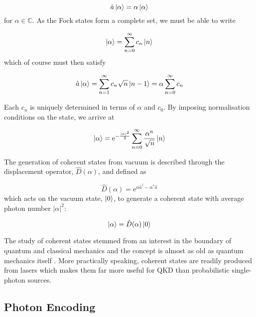 \begin{equation}
	\hat{a}\ket{\alpha} = \alpha\ket{\alpha}
\end{equation}
for $\alpha \in \mathbb{C}$. As the Fock states form a complete set, we must be able to write

\begin{equation}
	\ket{\alpha} = \sum_{n=0}^\infty c_n \ket{n}
\end{equation}
which of course must then satisfy

\begin{equation}
	\hat{a}\ket{\alpha} = \sum_{n=1}^\infty c_n \sqrt{n} \ket{n-1} = \alpha  \sum_{n=0}^\infty c_n
\end{equation}

Each $c_n$ is uniquely determined in terms of $\alpha$ and $c_0$. By imposing normalisation conditions on the state, we arrive at

\begin{equation}
	\ket{\alpha} = \mathrm{e}^{-\frac{|\alpha|^2}{2}} \sum_{n=0}^\infty \frac{\alpha^n}{\sqrt{n}} \ket{n} 
\end{equation}

The generation of coherent states from vacuum is described through the displacement operator, $\hat{D}(\alpha)$, and defined as

\begin{equation}
	\hat{D}(\alpha) = \mathrm{e}^{\alpha\hat{a}^\dagger - \alpha^\ast\hat{a}}
\end{equation}
which acts on the vacuum state, $\ket{0}$, to generate a coherent state with average photon number $|\alpha|^2$:

\begin{equation}
	\ket{\alpha} = \hat{D}(\alpha)\ket{0}
\end{equation}

The study of coherent states stemmed from an interest in the boundary of quantum and classical mechanics and the concept is almost as old as quantum mechanics itself \cite{Schrodinger1926}. More practically speaking, coherent states are readily produced from lasers which makes them far more useful for \ac{QKD} than probabilistic single-photon sources.

\subsection{Photon Encoding}
\label{sec:photon_encoding}

